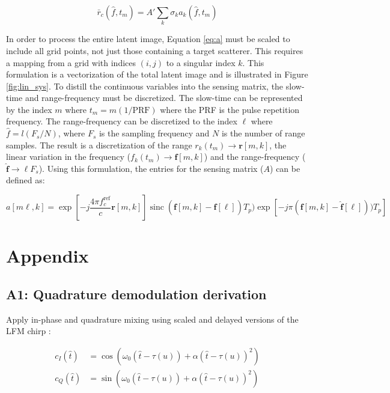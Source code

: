 \documentclass[fleqn,10pt]{olplainarticle}
\DeclareMathOperator{\sinc}{sinc}
\begin{document}
\begin{equation}
    \bar{r}_{c}(\hat{f},t_{m}) = A' \sum_k \sigma_k a_k (\hat{f},t_{m})
    \label{eq:a}
\end{equation}

\noindent In order to process the entire latent image, Equation \ref{eq:a} must be scaled to include all grid points, not just those containing a target scatterer. This requires a mapping from a grid with indices $(i,j)$ to a singular index $k$. This formulation is a vectorization of the total latent image and is illustrated in Figure \ref{fig:lin_sys}. To distill the continuous variables into the sensing matrix, the slow-time and range-frequency must be discretized. The slow-time can be represented by the index $m$ where $t_{m} = m(1/\text{PRF})$ where the PRF is the pulse repetition frequency. The range-frequency can be discretized to the index $\ell$ where $\hat{f} = l(F_{s}/N)$, where $F_{s}$ is the sampling frequency and $N$ is the number of range samples. The result is a discretization of the range $r_{k}(t_{m}) \rightarrow \mathbf{r}[m,k]$, the linear variation in the frequency ($f_{k}(t_{m}) \rightarrow \mathbf{f}[m,k]$) and the range-frequency ($\mathbf{\hat{f}} \rightarrow \ell F_{s}$). Using this formulation, the entries for the sensing matrix ($A$) can be defined as:

\begin{equation}
    a[m\ell, k] = \exp \left[ -j \frac{4\pi f_{c}^{\text{ref}}}{c} \mathbf{r}[m,k] \right] \sinc (\mathbf{f}[m,k]-\mathbf{\hat{f}}[\ell]) T_p)\exp \left[ -j \pi \left( \mathbf{f}[m,k]-\mathbf{\hat{f}}[\ell] \right))T_p\right]
\end{equation}



\section*{Appendix}

\subsection*{A1: Quadrature demodulation derivation}

Apply in-phase and quadrature mixing using scaled and delayed versions of the LFM chirp \citep{Jakowatz1996}:

\begin{equation}
    \begin{aligned}
        c_{I}(\hat{t}) &= \cos(\omega_{0}(\hat{t} - \tau(u)) +\alpha(\hat{t} - \tau(u))^{2}) \\
        c_{Q}(\hat{t}) &= \sin(\omega_{0}(\hat{t} - \tau(u)) +\alpha(\hat{t} - \tau(u))^{2})
    \end{aligned}
    \label{eq:IQ}
\end{equation}
\end{document}
